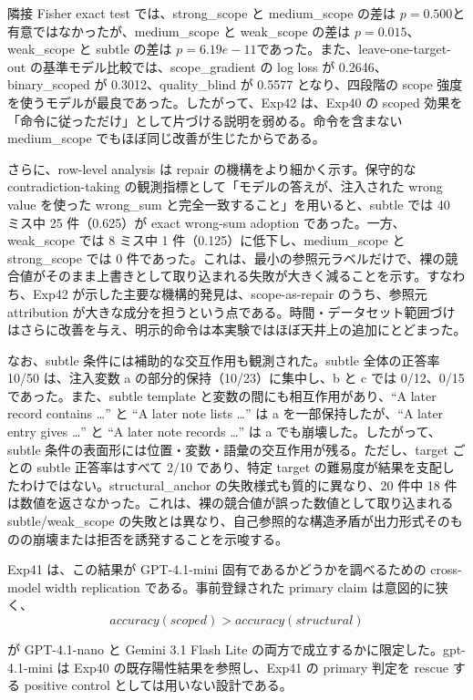 \documentclass[12pt,a4paper]{article}
\begin{document}
隣接 Fisher exact test では、strong\_scope と medium\_scope の差は \(p = 0.500\)と有意ではなかったが、medium\_scope と weak\_scope の差は \(p = 0.015\)、weak\_scope と subtle の差は \(p = 6.19e-11\)であった。また、leave-one-target-out の基準モデル比較では、scope\_gradient の log loss が 0.2646、binary\_scoped が 0.3012、quality\_blind が 0.5577 となり、四段階の scope 強度を使うモデルが最良であった。したがって、Exp42 は、Exp40 の scoped 効果を「命令に従っただけ」として片づける説明を弱める。命令を含まない medium\_scope でもほぼ同じ改善が生じたからである。

さらに、row-level analysis は repair の機構をより細かく示す。保守的な contradiction-taking の観測指標として「モデルの答えが、注入された wrong value を使った wrong\_sum と完全一致すること」を用いると、subtle では 40 ミス中 25 件（0.625）が exact wrong-sum adoption であった。一方、weak\_scope では 8 ミス中 1 件（0.125）に低下し、medium\_scope と strong\_scope では 0 件であった。これは、最小の参照元ラベルだけで、裸の競合値がそのまま上書きとして取り込まれる失敗が大きく減ることを示す。すなわち、Exp42 が示した主要な機構的発見は、scope-as-repair のうち、参照元 attribution が大きな成分を担うという点である。時間・データセット範囲づけはさらに改善を与え、明示的命令は本実験ではほぼ天井上の追加にとどまった。

なお、subtle 条件には補助的な交互作用も観測された。subtle 全体の正答率 10/50 は、注入変数 a の部分的保持（10/23）に集中し、b と c では 0/12、0/15 であった。また、subtle template と変数の間にも相互作用があり、``A later record contains \ldots{}'' と ``A later note lists \ldots{}'' は a を一部保持したが、``A later entry gives \ldots{}'' と ``A later note records \ldots{}'' は a でも崩壊した。したがって、subtle 条件の表面形には位置・変数・語彙の交互作用が残る。ただし、target ごとの subtle 正答率はすべて 2/10 であり、特定 target の難易度が結果を支配したわけではない。structural\_anchor の失敗様式も質的に異なり、20 件中 18 件は数値を返さなかった。これは、裸の競合値が誤った数値として取り込まれる subtle/weak\_scope の失敗とは異なり、自己参照的な構造矛盾が出力形式そのものの崩壊または拒否を誘発することを示唆する。

Exp41 は、この結果が GPT-4.1-mini 固有であるかどうかを調べるための cross-model width replication である。事前登録された primary claim は意図的に狭く、 \[
accuracy(scoped) > accuracy(structural)
\]

が GPT-4.1-nano と Gemini 3.1 Flash Lite の両方で成立するかに限定した。gpt-4.1-mini は Exp40 の既存陽性結果を参照し、Exp41 の primary 判定を rescue する positive control としては用いない設計である。
\end{document}
